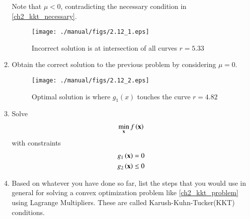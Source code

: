 \documentclass[journal,12pt,twocolumn]{IEEEtran}
\renewcommand\thesection{\arabic{section}}
\begin{document}
\begin{enumerate}[label=\thesection.\arabic*,ref=\thesection.\theenumi]
%
Note that $\mu < 0 $, contradicting the necessary condition in \eqref{ch2_kkt_necessary}. 
%
\begin{figure}[!ht]
\centering
\texttt{[image: ./manual/figs/2.12\_1.eps]}
\caption{ Incorrect solution is at intersection of all curves $r = 5.33$}
\label{fig.2.12}	
\end{figure}
\item
Obtain the correct solution to the previous problem by considering $\mu = 0$.

\begin{figure}[!ht]
\centering
\texttt{[image: ./manual/figs/2.12\_2.eps]}
\caption{ Optimal solution is where $g_1(x)$ touches the curve $r = 4.82$}
\label{fig.2.13}	
\end{figure}
%
%
\item
Solve
 \begin{align}
\min_{\mbf{x}} f\brak{\mbf{x}} %
 \end{align}
 with constraints
 \begin{align}
 g_1\left(\mathbf{x}\right) 
= 0\\
 g_2 \left(\mathbf{x}\right)
\leq 0
 \end{align}
 
%
\item
Based on whatever you have done so far,	list the steps that you would use in general for solving a convex optimization problem  like \eqref{ch2_kkt_problem}  using Lagrange Multipliers. 
These are called Karush-Kuhn-Tucker(KKT) conditions.


\end{enumerate}
\end{document}
